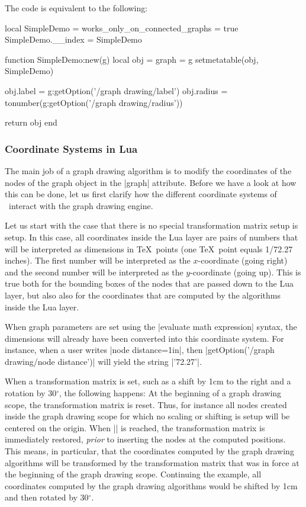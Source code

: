 The code is equivalent to the following:
\begin{codeexample}
local SimpleDemo = { works_only_on_connected_graphs = true }
SimpleDemo.__index = SimpleDemo

function SimpleDemo:new(g)
  local obj = { graph = g }
  setmetatable(obj, SimpleDemo)
  
  obj.label  = g:getOption('/graph drawing/label')
  obj.radius = tonumber(g:getOption('/graph drawing/radius'))
  
  return obj  
end  
\end{codeexample}



\subsubsection{Coordinate Systems in Lua}

\label{section-gd-lua-coordinates}

The main job of a graph drawing algorithm is to modify the
coordinates of the nodes of the graph object in the |graph|
attribute. Before we have a look at how this can be done, let us 
first clarify how the different coordinate systems of \pgfname\
interact with the graph drawing engine.

Let us start with the case that there is no special transformation
matrix setup is setup. In this case, all coordinates inside the Lua
layer are pairs of numbers that will be interpreted as dimensions in
\TeX\ points (one \TeX\ point equals 1/72.27 inches). The first number
will be interpreted as the $x$-coordinate (going right) and the second
number will be interpreted as the $y$-coordinate (going up). This is
true both for the bounding boxes of the nodes that are passed down to
the Lua layer, but also also for the coordinates that are computed by
the algorithms inside the Lua layer.

When graph parameters are set using the |evaluate math expression|
syntax, the dimensions will already have been converted into this
coordinate system. For instance, when a user writes
|node distance=1in|, then |getOption('/graph drawing/node distance')|
will yield the string |'72.27'|.

When a transformation matrix is
set, such as a shift by 1cm to the right and a rotation by
30$^\circ$, the following happens: At the beginning of a
graph drawing scope, the transformation matrix is reset. Thus, for
instance all nodes created inside the graph drawing scope for which no
scaling or shifting is setup will be centered on the origin. When
|\pgfgdendscope| is reached, the transformation matrix is immediately
restored, \emph{prior} to inserting the nodes at the computed
positions. This means, in particular, that the coordinates computed by
the graph drawing algorithms will be transformed by the transformation
matrix that was in force at the beginning of the graph drawing
scope. Continuing the example, all coordinates computed by the graph
drawing algorithms would be shifted by 1cm and then rotated by
30$^\circ$.

